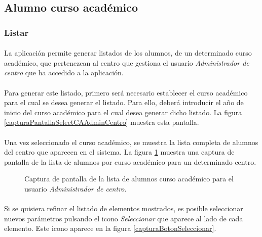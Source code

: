 \subsection{Alumno curso académico}

  \subsubsection{Listar}

  \paragraph{}La aplicación permite generar listados de los alumnos, de un
  determinado curso académico, que pertenezcan al centro que gestiona el usuario
  \textit{Administrador de centro} que ha accedido a la aplicación.

  \paragraph{}Para generar este listado, primero será necesario establecer el
  curso académico para el cual se desea generar el listado. Para ello, deberá
  introducir el año de inicio del curso académico para el cual desea generar
  dicho listado. La figura \ref{capturaPantallaSelectCAAdminCentro} muestra esta
  pantalla.

  \paragraph{}Una vez seleccionado el curso académico, se muestra la lista
  completa de alumnos del centro que aparecen en el sistema. La figura
  \ref{capturaPantallaListaAlumnosCAAdminCentro} muestra
  una captura de pantalla de la lista de alumnos por curso académico para un
  determinado centro.

  \begin{figure}[!ht]
    \begin{center}
      \caption{Captura de pantalla de la lista de alumnos curso académico para el usuario \textit{Administrador de centro}.}
      \label{capturaPantallaListaAlumnosCAAdminCentro}
    \end{center}
  \end{figure}

  \paragraph{}Si se quisiera refinar el listado de elementos mostrados, es
  posible seleccionar nuevos parámetros pulsando el icono \textit{Seleccionar}
  que aparece al lado de cada elemento. Este icono aparece en la figura
  \ref{capturaBotonSeleccionar}.